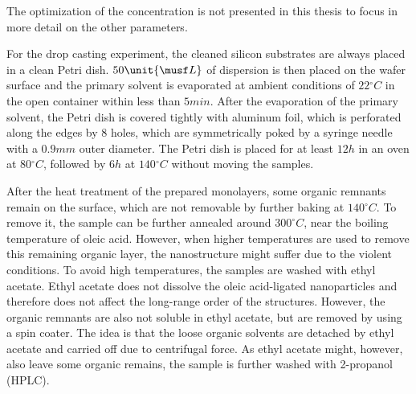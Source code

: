 \documentclass[\main/dresen_thesis.tex]{subfiles}
\begin{document}
    The optimization of the concentration is not presented in this thesis to focus in more detail on the other parameters.

      For the drop casting experiment, the cleaned silicon substrates are always placed in a clean Petri dish.
      $50 \unit{\musf L}$ of dispersion is then placed on the wafer surface and the primary solvent is evaporated at ambient conditions of $22 \unit{^\circ C}$ in the open container within less than $5 \unit{min}$.
      After the evaporation of the primary solvent, the Petri dish is covered tightly with aluminum foil, which is perforated along the edges by 8 holes, which are symmetrically poked by a syringe needle with a $0.9 \unit{mm}$ outer diameter.
      The Petri dish is placed for at least $12 \unit{h}$ in an oven at $80 \unit{^\circ C}$, followed by $6 \unit{h}$ at $140\unit{^\circ C}$ without moving the samples.

      After the heat treatment of the prepared monolayers, some organic remnants remain on the surface, which are not removable by further baking at $140 \unit{^\circ C}$.
      To remove it, the sample can be further annealed around $300 ^\circ C$, near the boiling temperature of oleic acid.
      However, when higher temperatures are used to remove this remaining organic layer, the nanostructure might suffer due to the violent conditions.
      To avoid high temperatures, the samples are washed with ethyl acetate.
      Ethyl acetate does not dissolve the oleic acid-ligated nanoparticles and therefore does not affect the long-range order of the structures.
      However, the organic remnants are also not soluble in ethyl acetate, but are removed by using a spin coater.
      The idea is that the loose organic solvents are detached by ethyl acetate and carried off due to centrifugal force.
      As ethyl acetate might, however, also leave some organic remains, the sample is further washed with 2-propanol (HPLC).
\end{document}
